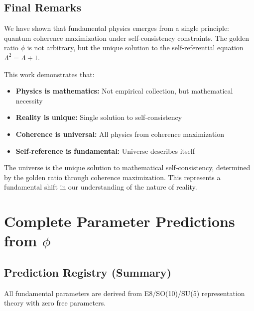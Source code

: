 \documentclass[11pt]{article}
\theoremstyle{definition}
\newcommand{\goldenratio}{\phi}
\begin{document}
\subsection{Final Remarks}

We have shown that fundamental physics emerges from a single principle: quantum coherence maximization under self-consistency constraints. The golden ratio $\goldenratio$ is not arbitrary, but the unique solution to the self-referential equation $\Lambda^2 = \Lambda + 1$.

This work demonstrates that:
\begin{itemize}
\item \textbf{Physics is mathematics:} Not empirical collection, but mathematical necessity
\item \textbf{Reality is unique:} Single solution to self-consistency
\item \textbf{Coherence is universal:} All physics from coherence maximization
\item \textbf{Self-reference is fundamental:} Universe describes itself
\end{itemize}

The universe is the unique solution to mathematical self-consistency, determined by the golden ratio through coherence maximization. This represents a fundamental shift in our understanding of the nature of reality.

\appendix

\section{Complete Parameter Predictions from $\goldenratio$}

\subsection{Prediction Registry (Summary)}

All fundamental parameters are derived from E8/SO(10)/SU(5) representation theory with zero free parameters.
\end{document}

